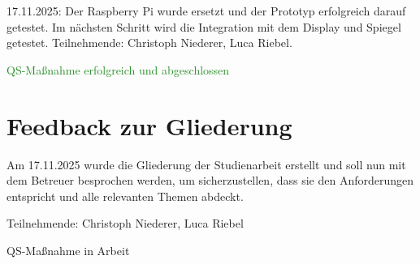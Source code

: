 17.11.2025: Der Raspberry Pi wurde ersetzt und der Prototyp erfolgreich darauf getestet. Im nächsten Schritt wird die Integration mit dem Display und Spiegel getestet.
Teilnehmende: Christoph Niederer, Luca Riebel.

{\textcolor{ForestGreen}{QS-Maßnahme erfolgreich und abgeschlossen}}

\section{Feedback zur Gliederung}
Am 17.11.2025 wurde die Gliederung der Studienarbeit erstellt und soll nun mit dem Betreuer besprochen werden, um sicherzustellen, dass sie den Anforderungen entspricht und alle relevanten Themen abdeckt.

Teilnehmende: Christoph Niederer, Luca Riebel

{\textcolor{yellow!80!brown}{QS-Maßnahme in Arbeit}}